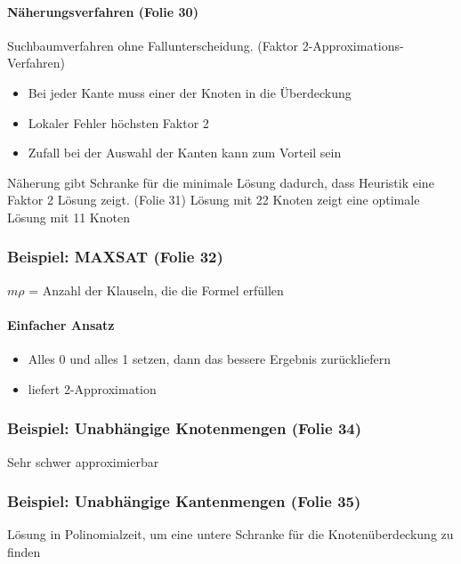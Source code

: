 \documentclass[a4paper,11pt]{article}
\begin{document}
\paragraph*{Näherungsverfahren (Folie 30)}
Suchbaumverfahren ohne Fallunterscheidung. (Faktor 2-Approximations-Verfahren)
\begin{itemize}
  \item Bei jeder Kante muss einer der Knoten in die Überdeckung 
  \item Lokaler Fehler höchsten Faktor 2
  \item Zufall bei der Auswahl der Kanten kann zum Vorteil sein
\end{itemize} 

Näherung gibt Schranke für die minimale Lösung dadurch, dass Heuristik eine Faktor 2 Lösung zeigt.
\Rightarrow (Folie 31) Lösung mit 22 Knoten zeigt eine optimale Lösung mit 11 Knoten

\subsubsection*{Beispiel: MAXSAT (Folie 32)}
$ m\rho $ = Anzahl der Klauseln, die die Formel erfüllen
\paragraph*{Einfacher Ansatz}
\begin{itemize}
  \item Alles 0 und alles 1 setzen, dann das bessere Ergebnis zurückliefern
  \item \Rightarrow liefert 2-Approximation
\end{itemize}

\subsubsection*{Beispiel: Unabhängige Knotenmengen (Folie 34)}
Sehr schwer approximierbar

\subsubsection*{Beispiel: Unabhängige Kantenmengen (Folie 35)}
Lösung in Polinomialzeit, um eine untere Schranke für die Knotenüberdeckung zu finden
\end{document}
